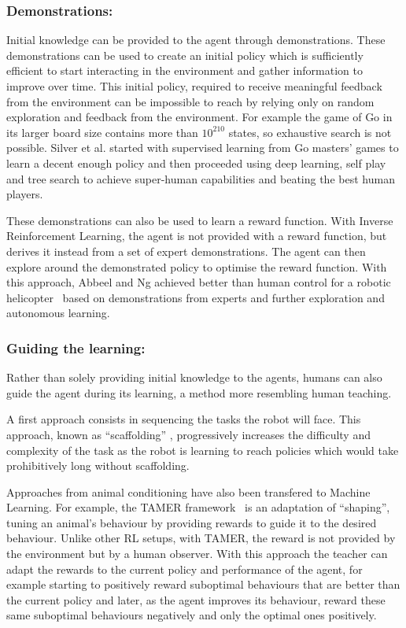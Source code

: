 \documentclass[letterpaper]{article} %
\begin{document}
\subsubsection{Demonstrations:} 
Initial knowledge can be provided to the agent
through demonstrations. These demonstrations can be used to create an initial
policy which is sufficiently efficient to start interacting in the environment
and gather information to improve over time. This initial policy, required to
receive meaningful feedback from the environment can be impossible to reach by
relying only on random exploration and feedback from the environment. For
example the game of Go in its larger board size contains more than $10^{210}$
states, so exhaustive search is not possible.  Silver et al.
\cite{silver2016mastering} started with supervised learning from Go masters'
games to learn a decent enough policy and then proceeded using deep learning,
self play and tree search to achieve super-human capabilities and beating the
best human players.

These demonstrations can also be used to learn a reward function. With Inverse
Reinforcement Learning, the agent is not provided with a reward function, but
derives it instead from a set of expert demonstrations. The agent can then
explore around the demonstrated policy to optimise the reward function. With
this approach, Abbeel and Ng achieved better than human control for a robotic
helicopter~\cite{abbeel2004apprenticeship} based on demonstrations from experts
and further exploration and autonomous learning.

\subsubsection{Guiding the learning:}
Rather than solely providing initial knowledge to the agents, humans can also
guide the agent during its learning, a method more resembling human teaching. 

A first approach consists in sequencing the tasks the robot will face.  This
approach, known as ``scaffolding'' \cite{saunders2006teaching}, progressively
increases the difficulty and complexity of the task as the robot is learning to
reach policies which would take prohibitively long without scaffolding.

Approaches from animal conditioning have also been transfered to Machine
Learning.  For example, the TAMER framework~\cite{knox2009interactively} is an
adaptation of ``shaping'', tuning an animal's behaviour by providing rewards to
guide it to the desired behaviour. Unlike other RL setups, with TAMER, the
reward is not provided by the environment but by a human observer. With this
approach the teacher can adapt the rewards to the current policy and performance
of the agent, for example starting to positively reward suboptimal behaviours
that are better than the current policy and later, as the agent improves its
behaviour, reward these same suboptimal behaviours negatively and only the
optimal ones positively.
\end{document}
